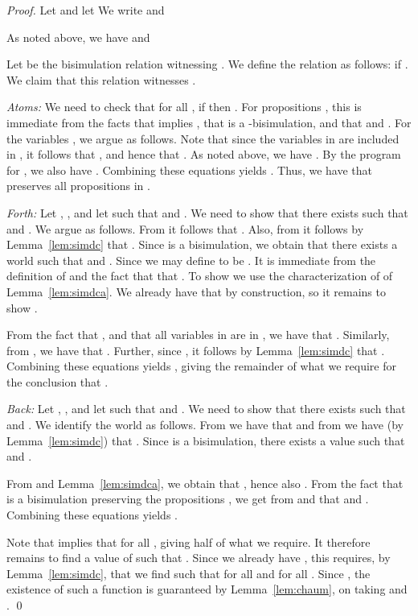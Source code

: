 \documentclass[]{llncs}
\begin{document}
\begin{proof} 
Let  and
let 
We write 
 and

As noted above, we have  and 
 

Let  be the bisimulation relation witnessing  . 
We define the relation  as follows:
 if . 
We claim that this relation witnesses . 


{\em Atoms:} We need to check that for all , 
if  then . For propositions , this 
is immediate from the facts that  implies , that  is a -bisimulation, 
and that  and . For the variables , we argue as follows. Note that since 
the variables in  are included in , it follows that , 
and hence that  .
As noted above, we have 
. 
By the program for , we also have 
. 
Combining these equations yields . 
Thus, we have that  preserves all propositions in . 


\textit{Forth:} Let , , and let  
such that  
and . We need to show that there exists  
such that  and . 
We argue as follows. From  it follows that 
.  Also,  from  it follows 
by Lemma~\ref{lem:simdc} that .
Since  is a bisimulation, we obtain that there exists a world 
such that  and . Since  we may 
define  to be . It is immediate from the definition of  
and the fact that  that . 
To show    we use the characterization of  
of Lemma~\ref{lem:simdca}. We already have that  by construction, 
so it remains to show . 

From the fact that 
, and that all variables in  are in , 
we have that .
Similarly, from , 
we have that . 
Further, since  , it follows 
by Lemma~\ref{lem:simdc} that  . 
Combining these equations yields , 
giving the remainder of what we require for the conclusion that 
. 


\textit{Back:}  Let , , and let  
such that  and  . 
We need to show that there exists  
such that  and .
We identify the world  as follows. 
From  we have  that  and 
from   we have (by Lemma~\ref{lem:simdc})
that . Since  is a bisimulation, there exists a 
value  such that   and . 

From  and Lemma~\ref{lem:simdca}, we obtain that 
, 
hence also . 
From the fact that  is a bisimulation preserving the propositions , 
we get from   and   that 
 and . 
Combining these equations yields . 

Note that    implies that  for all 
, giving half of what we require. 
It therefore remains to find a value of  such that 
. Since we already have ,  
 this requires, by Lemma~\ref{lem:simdc}, that we find  such that 
 for all  and 
 for all 
.  Since , the existence of such a function  is guaranteed by Lemma~\ref{lem:chaum}, 
on taking  and . 
\qed
\end{proof} 
\end{document}
